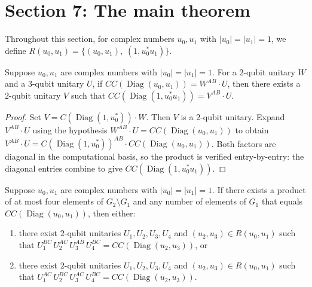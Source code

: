 \section{Section 7: The main theorem}

Throughout this section, for complex numbers $u_0, u_1$ with
$|u_0| = |u_1| = 1$, we define
$R(u_0, u_1) = \{(u_0, u_1),\; (1, u_0^* u_1)\}$.

\begin{lemma}
  \label{lem:s7_1}
  \leanok
  Suppose $u_0, u_1$ are complex numbers with $|u_0| = |u_1| = 1$.
  For a $2$-qubit unitary $W$ and a $3$-qubit unitary $U$,
  if $CC(\operatorname{Diag}(u_0, u_1)) = W^{AB} \cdot U$,
  then there exists a $2$-qubit unitary $V$ such that
  $CC(\operatorname{Diag}(1, u_0^* u_1)) = V^{AB} \cdot U$.
\end{lemma}

\begin{proof}
  \leanok
  Set $V = C(\operatorname{Diag}(1, u_0^*)) \cdot W$.
  Then $V$ is a $2$-qubit unitary.
  Expand $V^{AB} \cdot U$ using the hypothesis
  $W^{AB} \cdot U = CC(\operatorname{Diag}(u_0, u_1))$ to obtain
  $V^{AB} \cdot U
    = C(\operatorname{Diag}(1, u_0^*))^{AB}
      \cdot CC(\operatorname{Diag}(u_0, u_1))$.
  Both factors are diagonal in the computational basis,
  so the product is verified entry-by-entry:
  the diagonal entries combine to give
  $CC(\operatorname{Diag}(1, u_0^* u_1))$.
\end{proof}

\begin{lemma}
  \label{lem:s7_2}
  \leanok
  Suppose $u_0, u_1$ are complex numbers with $|u_0| = |u_1| = 1$.
  If there exists a product of at most four elements of
  $G_2 \setminus G_1$ and any number of elements of $G_1$ that equals
  $CC(\operatorname{Diag}(u_0, u_1))$, then either:
  \begin{enumerate}
    \item there exist $2$-qubit unitaries $U_1, U_2, U_3, U_4$
      and $(u_2, u_3) \in R(u_0, u_1)$ such that
      $U_1^{BC}\, U_2^{AC}\, U_3^{AB}\, U_4^{BC}
        = CC(\operatorname{Diag}(u_2, u_3))$,
      or
    \item there exist $2$-qubit unitaries $U_1, U_2, U_3, U_4$
      and $(u_2, u_3) \in R(u_0, u_1)$ such that
      $U_1^{AC}\, U_2^{BC}\, U_3^{AC}\, U_4^{BC}
        = CC(\operatorname{Diag}(u_2, u_3))$.
  \end{enumerate}
\end{lemma}


